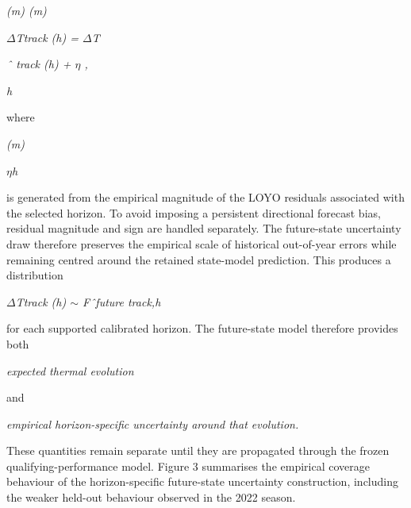 \begin{center}\textit{(m)                           (m)}\end{center}

\begin{center}\textit{\ensuremath{\Delta}Ttrack (h) = \ensuremath{\Delta}T}\end{center}

\begin{center}\textit{ˆ track (h) + \ensuremath{\eta} ,}\end{center}

\begin{center}\textit{h}\end{center}

where

\begin{center}\textit{(m)}\end{center}

\begin{center}\textit{\ensuremath{\eta}h}\end{center}

is generated from the empirical magnitude of the LOYO residuals associated with the selected horizon. To avoid imposing a persistent directional forecast bias, residual magnitude and sign are handled separately. The future-state uncertainty draw therefore preserves the empirical scale of historical out-of-year errors while remaining centred around the retained state-model prediction. This produces a distribution

\begin{center}\textit{\ensuremath{\Delta}Ttrack (h) \ensuremath{\sim} Fˆfuture track,h}\end{center}

for each supported calibrated horizon. The future-state model therefore provides both

\begin{center}\textit{expected thermal evolution}\end{center}

and

\begin{center}\textit{empirical horizon-specific uncertainty around that evolution.}\end{center}

These quantities remain separate until they are propagated through the frozen qualifying-performance model. Figure 3 summarises the empirical coverage behaviour of the horizon-specific future-state uncertainty construction, including the weaker held-out behaviour observed in the 2022 season.

